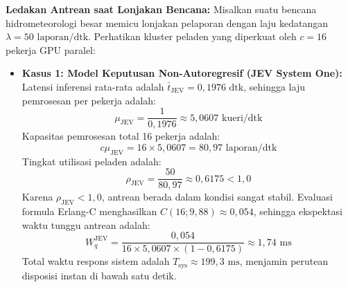 \documentclass[journal,compsoc]{IEEEtran}
\begin{document}
\noindent\textbf{Ledakan Antrean saat Lonjakan Bencana:}
Misalkan suatu bencana hidrometeorologi besar memicu lonjakan pelaporan dengan laju kedatangan $\lambda = 50 \text{ laporan/dtk}$. Perhatikan kluster peladen yang diperkuat oleh $c = 16$ pekerja GPU paralel:
\begin{itemize}
    \item \textbf{Kasus 1: Model Keputusan Non-Autoregresif (JEV System One):}
    Latensi inferensi rata-rata adalah $\bar{t}_{\text{JEV}} = 0{,}1976 \text{ dtk}$, sehingga laju pemrosesan per pekerja adalah:
    \begin{equation}
    \mu_{\text{JEV}} = \frac{1}{0{,}1976} \approx 5{,}0607 \text{ kueri/dtk}
    \end{equation}
    Kapasitas pemrosesan total 16 pekerja adalah:
    \begin{equation}
    c \mu_{\text{JEV}} = 16 \times 5{,}0607 = 80{,}97 \text{ laporan/dtk}
    \end{equation}
    Tingkat utilisasi peladen adalah:
    \begin{equation}
    \rho_{\text{JEV}} = \frac{50}{80{,}97} \approx 0{,}6175 < 1{,}0
    \end{equation}
    Karena $\rho_{\text{JEV}} < 1{,}0$, antrean berada dalam kondisi sangat stabil. Evaluasi formula Erlang-C menghasilkan $C(16; 9{,}88) \approx 0{,}054$, sehingga ekspektasi waktu tunggu antrean adalah:
    \begin{equation}
    W_q^{\text{JEV}} = \frac{0{,}054}{16 \times 5{,}0607 \times (1 - 0{,}6175)} \approx 1{,}74 \text{ ms}
    \end{equation}
    Total waktu respons sistem adalah $T_{\text{sys}} \approx 199{,}3 \text{ ms}$, menjamin perutean disposisi instan di bawah satu detik.
    

\end{itemize}
\end{document}
